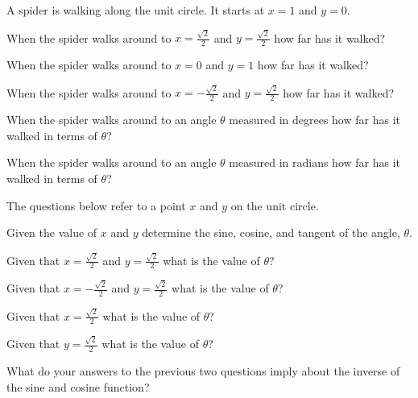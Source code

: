 \begin{problem}
\item A spider is walking along the unit circle. It starts at $x=1$
  and $y=0$.

  \scalebox{0.35}{}

  \begin{subproblem}
    \item When the spider walks around to $x=\frac{\sqrt{2}}{2}$ and
      $y=\frac{\sqrt{2}}{2}$ how far has it walked?
      \vfill
    \item When the spider walks around to $x=0$ and
      $y=1$ how far has it walked?
      \vfill
    \item When the spider walks around to $x=-\frac{\sqrt{2}}{2}$ and
      $y=\frac{\sqrt{2}}{2}$ how far has it walked?
      \vfill
    \item When the spider walks around to an angle $\theta$ measured
      in degrees how far has it walked in terms of $\theta$?
      \vfill
    \item When the spider walks around to an angle $\theta$ measured
      in radians how far has it walked in terms of $\theta$?
      \vfill
  \end{subproblem}

  \clearpage

\item The questions below refer to a point $x$ and $y$ on the unit circle.

  \scalebox{0.35}{}

  \begin{subproblem}
  \item Given the value of $x$ and $y$ determine the sine, cosine, and
    tangent of the angle, $\theta$.
    \vfill
  \item Given that $x=\frac{\sqrt{2}}{2}$ and $y=\frac{\sqrt{2}}{2}$
    what is the value of $\theta$?
    \vfill
  \item Given that $x=-\frac{\sqrt{2}}{2}$ and $y=\frac{\sqrt{2}}{2}$
    what is the value of $\theta$?
    \vfill
  \item Given that $x=\frac{\sqrt{2}}{2}$ what is the value of
    $\theta$?  
    \vfill
  \item Given that $y=\frac{\sqrt{2}}{2}$ what is the value of
    $\theta$?  
    \vfill
  \item What do your answers to the previous two questions imply about
    the inverse of the sine and cosine function?
    \vfill
  \end{subproblem}


\end{problem}
